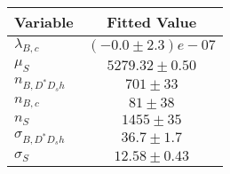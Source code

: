 \begin{tabular}[t]{lc}
\hline
Variable &Fitted Value\\
\hline\hline
$\lambda_{B,c}$&$(-0.0\pm2.3)e-07$\\
\hline
$\mu_S$&$5279.32\pm0.50$\\
\hline
$n_{B, D^* D_s h}$&$701\pm33$\\
\hline
$n_{B,c}$&$81\pm38$\\
\hline
$n_S$&$1455\pm35$\\
\hline
$\sigma_{B, D^* D_s h}$&$36.7\pm1.7$\\
\hline
$\sigma_S$&$12.58\pm0.43$\\
\hline
\end{tabular}